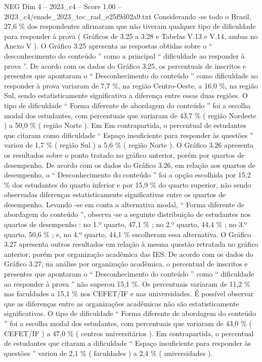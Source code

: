 \begin{textsample}{NEG Dim 4 – 2023\_c4 – Score 1.00 – 2023\_c4/enade\_2023\_tec\_rad\_e25f9d02a9.txt}
Considerando -se todo o Brasil, 27,6 \% dos respondentes afirmaram que não tiveram qualquer tipo de dificuldade para responder à prova ( Gráficos de 3.25 a 3.28 e Tabelas V.13 e V.14, ambas no Anexo V ).
O Gráfico 3.25 apresenta as respostas obtidas sobre o “ desconhecimento do conteúdo ” como a principal “ dificuldade ao responder à prova ”.
De acordo com os dados do Gráfico 3.25, os percentuais de inscritos e presentes que apontaram o “ Desconhecimento do conteúdo ” como dificuldade ao responder à prova variaram de 7,7 \%, na região Centro-Oeste, a 16,0 \%, na região Sul, sendo estatisticamente significativa a diferença entre essas duas regiões.
O tipo de dificuldade “ Forma diferente de abordagem do conteúdo ” foi a escolha modal dos estudantes, com percentuais que variaram de 43,7 \% ( região Nordeste ) a 50,0 \% ( região Norte ).
Em Em contrapartida, o percentual de estudantes que citaram como dificuldade “ Espaço insuficiente para responder às questões ” variou de 1,7 \% ( região Sul ) a 5,6 \% ( região Norte ).
O Gráfico 3.26 apresenta os resultados sobre o ponto tratado no gráfico anterior, porém por quartos de desempenho.
De acordo com os dados do Gráfico 3.26, em relação aos quartos de desempenho, o “ Desconhecimento do conteúdo ” foi a opção escolhida por 15,2 \% dos estudantes do quarto inferior e por 15,9 \% do quarto superior, não sendo observadas diferenças estatisticamente significativas entre os quartos de desempenho.
Levando -se em conta a alternativa modal, “ Forma diferente de abordagem do conteúdo ”, observa -se a seguinte distribuição de estudantes nos quartos de desempenho : no 1.º quarto, 47,1 \% ; no 2.º quarto, 44,4 \% ; no 3.º quarto, 50,6 \% ; e, no 4.º quarto, 44,1 \% escolheram essa alternativa.
O Gráfico 3.27 apresenta outros resultados em relação à mesma questão retratada no gráfico anterior, porém por organização acadêmica das IES.
De acordo com os dados do Gráfico 3.27, na análise por organização acadêmica, o percentual de inscritos e presentes que apontaram o “ Desconhecimento do conteúdo ” como “ dificuldade ao responder à prova ” não superou 15,1 \%.
Os percentuais variaram de 11,2 \% nas faculdades a 15,1 \% nos CEFET/IF e nas universidades.
É possível observar que as diferenças entre as organizações acadêmicas não são estatisticamente significativas.
O tipo de dificuldade “ Forma diferente de abordagem do conteúdo ” foi a escolha modal dos estudantes, com percentuais que variaram de 43,0 \% ( CEFET/IF ) a 47,0 \% ( centros universitários ).
Em contrapartida, o percentual de estudantes que citaram a dificuldade “ Espaço insuficiente para responder às questões ” variou de 2,1 \% ( faculdades ) a 2,4 \% ( universidades ).

\end{textsample}
